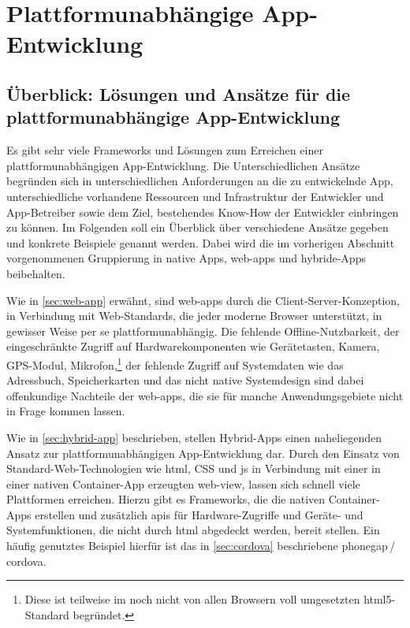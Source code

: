 \chapter{Plattformunabhängige App-Entwicklung}

\section[Überblick: Lösungen und Ansätze]{Überblick: Lösungen und Ansätze für die platt\-form\-un\-ab\-hängige App-Entwicklung} \label{overview}

Es gibt sehr viele Frameworks und Lösungen zum Erreichen einer plattformunabhängigen App-Entwicklung. Die Unterschiedlichen Ansätze begründen sich in unterschiedlichen Anforderungen an die zu entwickelnde App, unterschiedliche vorhandene Ressourcen und Infrastruktur der Entwickler und App-Betreiber sowie dem Ziel, bestehendes Know-How der Entwickler einbringen zu können.
Im Folgenden soll ein Überblick über verschiedene Ansätze gegeben und konkrete Beispiele genannt werden. Dabei wird die im vorherigen Abschnitt vorgenommenen Gruppierung in native Apps, \glspl{web-app} und hybride-Apps beibehalten.

Wie in \autoref{sec:web-app} erwähnt, sind \glspl{web-app} durch die Client-Server-Konzeption, in Verbindung mit Web-Standards, die jeder moderne Browser unterstützt, in gewisser Weise per se plattformunabhängig. Die fehlende Offline-Nutzbarkeit, der eingeschränkte Zugriff auf Hardwarekomponenten wie Gerätetasten, Kamera, GPS-Modul, Mikrofon,\footnote{Diese ist teilweise im noch nicht von allen Browsern voll umgesetzten \gls{html5}-Standard begründet.} der fehlende Zugriff auf Systemdaten wie das Adressbuch, Speicherkarten und das nicht native Systemdesign sind dabei offenkundige Nachteile der \glspl{web-app}, die sie für manche Anwendungsgebiete nicht in Frage kommen lassen.

Wie in \autoref{sec:hybrid-app} beschrieben, stellen Hybrid-Apps einen naheliegenden Ansatz zur plattformunabhängigen App-Entwicklung dar. Durch den Einsatz von Standard-Web-Technologien wie \gls{html}, CSS und \gls{js} in Verbindung mit einer in einer nativen Container-App erzeugten \gls{web-view}, lassen sich schnell viele Plattformen erreichen. Hierzu gibt es Frameworks, die die nativen Container-Apps erstellen und zusätzlich \glspl{api} für Hardware-Zugriffe und Geräte- und Systemfunktionen, die nicht durch \gls{html} abgedeckt werden, bereit stellen. Ein häufig genutztes Beispiel hierfür ist das in \autoref{sec:cordova} beschriebene \gls{phonegap}\,/\,\gls{cordova}.

